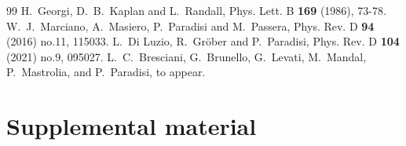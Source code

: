 \documentclass[prl,twocolumn,twoside,preprintnumbers,superscriptaddress, nofootinbib]{revtex4-2}
\begin{document}
\begin{thebibliography}{99}
H.~Georgi, D.~B.~Kaplan and L.~Randall,
Phys. Lett. B \textbf{169} (1986), 73-78.
%
W.~J.~Marciano, A.~Masiero, P.~Paradisi and M.~Passera,
Phys. Rev. D \textbf{94} (2016) no.11, 115033.
%
L.~Di Luzio, R.~Gr\"ober and P.~Paradisi,
Phys. Rev. D \textbf{104} (2021) no.9, 095027.
%
L.~C.~Bresciani, G.~Brunello, G.~Levati, M.~Mandal, P.~Mastrolia, and P.~Paradisi,
to appear.
\end{thebibliography}


\section{Supplemental material}
\end{document}
